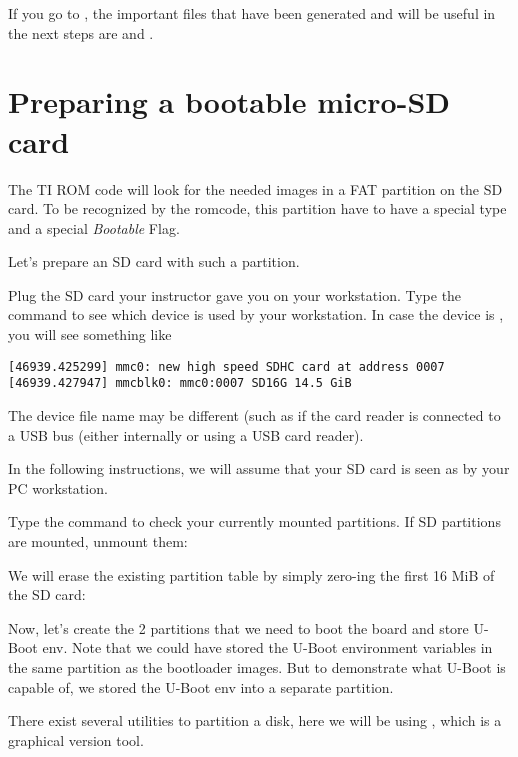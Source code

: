 If you go to
,
the important files that have been generated and will be useful in the
next steps are  and .

\section{Preparing a bootable micro-SD card}\label{sec:Prepboot}

The TI ROM code will look for the needed images in a FAT partition
on the SD card. To be recognized by the romcode, this partition have
to have a special type and a special {\em Bootable} Flag.

Let's prepare an SD card with such a partition.

Plug the SD card your instructor gave you on your workstation. Type
the  command to see which device is used by your
workstation. In case the device is , you will see
something like

\begin{verbatim}
[46939.425299] mmc0: new high speed SDHC card at address 0007
[46939.427947] mmcblk0: mmc0:0007 SD16G 14.5 GiB
\end{verbatim}

The device file name may be different (such as 
if the card reader is connected to a USB bus (either internally
or using a USB card reader).

In the following instructions, we will assume that your SD card is
seen as  by your PC workstation.

Type the  command to check your currently mounted
partitions. If SD partitions are mounted, unmount them:


We will erase the existing partition table by simply zero-ing the
first 16 MiB of the SD card:


Now, let's create the 2 partitions
that we need to boot the board and store U-Boot env. Note that we could have stored the
U-Boot environment variables in the same partition as the bootloader images.
But to demonstrate what U-Boot is capable of, we stored the U-Boot env
into a separate partition.

There exist several utilities to partition a disk, here we will
be using , which is a graphical version  tool.

